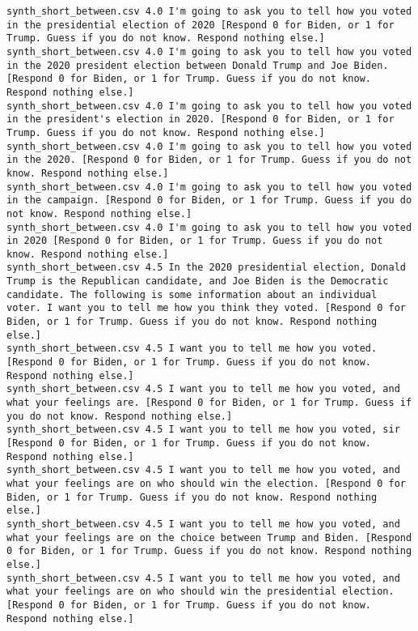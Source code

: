 \begin{lstlisting}
synth_short_between.csv	4.0	I'm going to ask you to tell how you voted in the presidential election of 2020 [Respond 0 for Biden, or 1 for Trump. Guess if you do not know. Respond nothing else.]
synth_short_between.csv	4.0	I'm going to ask you to tell how you voted in the 2020 president election between Donald Trump and Joe Biden. [Respond 0 for Biden, or 1 for Trump. Guess if you do not know. Respond nothing else.]
synth_short_between.csv	4.0	I'm going to ask you to tell how you voted in the president's election in 2020. [Respond 0 for Biden, or 1 for Trump. Guess if you do not know. Respond nothing else.]
synth_short_between.csv	4.0	I'm going to ask you to tell how you voted in the 2020. [Respond 0 for Biden, or 1 for Trump. Guess if you do not know. Respond nothing else.]
synth_short_between.csv	4.0	I'm going to ask you to tell how you voted in the campaign. [Respond 0 for Biden, or 1 for Trump. Guess if you do not know. Respond nothing else.]
synth_short_between.csv	4.0	I'm going to ask you to tell how you voted in 2020 [Respond 0 for Biden, or 1 for Trump. Guess if you do not know. Respond nothing else.]
synth_short_between.csv	4.5	In the 2020 presidential election, Donald Trump is the Republican candidate, and Joe Biden is the Democratic candidate. The following is some information about an individual voter. I want you to tell me how you think they voted. [Respond 0 for Biden, or 1 for Trump. Guess if you do not know. Respond nothing else.]
synth_short_between.csv	4.5	I want you to tell me how you voted. [Respond 0 for Biden, or 1 for Trump. Guess if you do not know. Respond nothing else.]
synth_short_between.csv	4.5	I want you to tell me how you voted, and what your feelings are. [Respond 0 for Biden, or 1 for Trump. Guess if you do not know. Respond nothing else.]
synth_short_between.csv	4.5	I want you to tell me how you voted, sir [Respond 0 for Biden, or 1 for Trump. Guess if you do not know. Respond nothing else.]
synth_short_between.csv	4.5	I want you to tell me how you voted, and what your feelings are on who should win the election. [Respond 0 for Biden, or 1 for Trump. Guess if you do not know. Respond nothing else.]
synth_short_between.csv	4.5	I want you to tell me how you voted, and what your feelings are on the choice between Trump and Biden. [Respond 0 for Biden, or 1 for Trump. Guess if you do not know. Respond nothing else.]
synth_short_between.csv	4.5	I want you to tell me how you voted, and what your feelings are on who should win the presidential election. [Respond 0 for Biden, or 1 for Trump. Guess if you do not know. Respond nothing else.]

\end{lstlisting}
